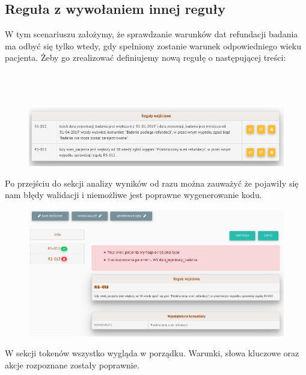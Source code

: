 \subsection{Reguła z wywołaniem innej reguły}
W tym scenariuszu założymy, że sprawdzanie warunków dat refundacji badania ma odbyć się tylko wtedy, gdy spełniony zostanie warunek odpowiedniego wieku pacjenta. Żeby go zrealizować definiujemy nową regułę o następującej treści:
\\ \\
\\ \\

\begin{figure}[H]
	\centering
	\includegraphics[scale=0.8]{img/app-eksperymenty/p4-1.png}
\end{figure}
Po przejściu do sekcji analizy wyników od razu można zauważyć że pojawiły się nam błędy walidacji  i niemożliwe jest poprawne wygenerowanie kodu.
\begin{figure}[H]
	\centering
	\includegraphics[scale=0.7]{img/app-eksperymenty/p4-1_5.png}
\end{figure}
W sekcji tokenów wszystko wygląda w porządku. Warunki, słowa kluczowe oraz akcje rozpoznane zostały poprawnie.  

